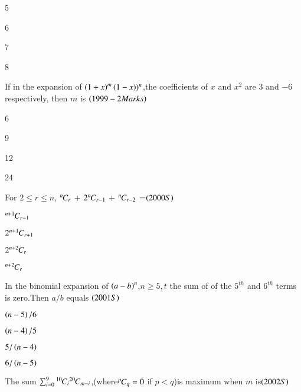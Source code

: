 \documentclass[journal,12pt,onecolumn]{IEEEtran}
\theoremstyle{remark}
\begin{document}
\begin{enumerate}
{\begin{enumerate}
\begin{multicols}{2}
    \item 5
    \item 6
    \item 7
    \item 8
    \end{multicols}
\end{enumerate}
\item If in the expansion of $\left(1+x\right)^m\left(1-x\right))^n$,the coefficients of $x$ and $x^2$ are $3$ and $-6$ respectively, then $m$ is
{\hfill$\left(1999-2Marks\right)$}
\begin{enumerate}
\begin{multicols}{2}
    \item 6
    \item 9
    \item 12
    \item 24
    \end{multicols}
\end{enumerate}
\item For $2\leq r\leq n$, ${{}^{n}\mkern-1muC_{r}}$ + $2{{}^{n}\mkern-1muC_{r-1}}$ + ${{}^{n}\mkern-1muC_{r-2}}$ =\hfill{$\left(2000S\right)$}
\begin{enumerate}\begin{multicols}{2} 
    \item ${{}^{n+1}\mkern-1muC_{r-1}}$ \item $2{{}^{n+1}\mkern-1muC_{r+1}}$
    \item $2{{}^{n+2}\mkern-1muC_{r}}$  \item ${{}^{n+2}\mkern-1muC_{r}}$
    \end{multicols}
\end{enumerate}
\item In the binomial expansion of $\left(a-b\right)^n$,$n\geq 5,t$ the sum of of the $5^{th}$ and $6^{th}$ terms is zero.Then $a/b$  equals
{\hfill $\left(2001S\right)$}
\begin{enumerate}
\begin{multicols}{2}
    \item $\left(n-5\right)/6$
    \item $\left(n-4\right)/5$
    \item $5/\left(n-4\right)$
    \item $6/\left(n-5\right)$
 \end{multicols}   
\end{enumerate}
\item The sum $\sum_{i=0}^{9} {{}^{10}\mkern-1muC_{i}}{{}^{20}\mkern-1muC_{m-i}}$,(where${{}^{p}\mkern-1muC_{q}}=0$ if {
$p<q$)}is maximum when $m$ is{\hfill$\left(2002S\right)$}
\begin{enumerate}
\begin{multicols}{2}

\end{multicols}
\end{enumerate}}
\end{enumerate}
\end{document}
